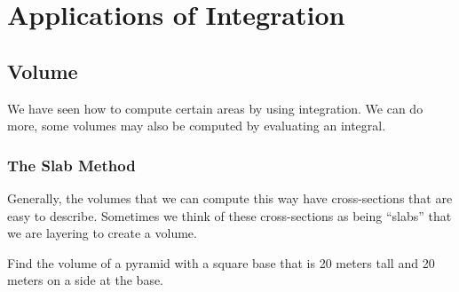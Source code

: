 \chapter{Applications of Integration}


\section{Volume}

We have seen how to compute certain areas by using integration. We can
do more, some volumes may also be computed by evaluating an
integral. 


\subsection{The Slab Method}

Generally, the volumes that we can compute this way have
cross-sections that are easy to describe. Sometimes we think of these
cross-sections as being ``slabs'' that we are layering to create a
volume.


\begin{example}
Find the volume of a pyramid with a square base that is 20 meters tall
and 20 meters on a side at the base. 
\end{example}

